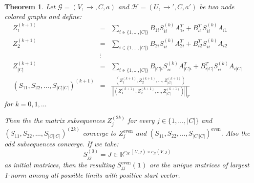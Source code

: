 \documentclass[a4paper,11pt]{report}
\newtheorem{theorem}{Theorem}[section]
\newcommand{\R}{{\mathbb R}}
\newcommand{\graf}{\mathscr{G}}
\newcommand{\grafeen}{\mathscr{H}}
\begin{document}
\begin{theorem}
  Let $\graf=(V,\to, C, a)$ and $\grafeen=(U,\to', C, a')$ be two node colored graphs and define:
  \begin{eqnarray*}
  Z^{(k+1)}_1 &=& \sum_{i \in \{1,\ldots, |C|\}}B_{1i}S^{(k)}_{ii}A^T_{1i} + B^T_{i1}S^{(k)}_{ii}A_{i1}\\
  Z^{(k+1)}_2 &=& \sum_{i \in \{1,\ldots, |C|\}}B_{2i}S^{(k)}_{ii}A^T_{2i} + B^T_{i2}S^{(k)}_{ii}A_{i2} \\
  &\vdots& \\
    Z^{(k+1)}_{|C|} &=& \sum_{i \in \{1,\ldots, |C|\}}B_{|C|i}S^{(k)}_{ii}A^T_{|C|i} + B^T_{i|C|}S^{(k)}_{ii}A_{i|C|} \\
 (S_{11}, S_{22},\ldots, S_{|C| |C|} )^{(k+1)} &=& \frac{\left(Z^{(k+1)}_1, Z^{(k+1)}_2, \ldots,Z^{(k+1)}_{|C|}\right)}{\left|\left|\left(Z^{(k+1)}_1, Z^{(k+1)}_2, \ldots,Z^{(k+1)}_{|C|}\right)\right|\right|_F}
  \end{eqnarray*}
 for $k = 0,1,\ldots$

 Then the the matrix subsequences $Z^{(2k)}_j$ for every $j \in \{1, \ldots, |C|\}$ 
 and $(S_{11}, S_{22},\ldots, S_{|C| |C|} )^{(2k)}$ converge to $Z^{\text{even}}_j$ and  $(S_{11}, S_{22},\ldots, S_{|C| |C|} 
 )^{\text{even}}$. Also the odd subsequences converge. If we take:
 $$S^{(0)}_{jj} = J\in \R^{c_\grafeen(U,j)\times c_\graf(V,j)}$$
 as initial matrices, then the resulting $S^{\text{even}}_{jj}(\mathbf{1})$ are 
 the unique matrices of largest 1-norm among all possible limits with positive 
 start vector.
  
\end{theorem}
  
\end{document}

